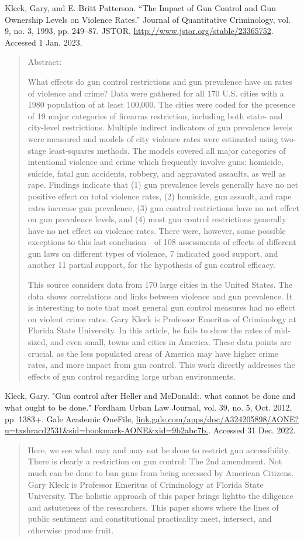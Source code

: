\documentclass [12pt]{article}
\newcommand{\bibent}{\noindent \hangindent 40pt}
\newcommand{\bibannote}{\begin{quotation}}
\newcommand{\bibendote}{\end{quotation}}
\begin{document}
\bibent Kleck, Gary, and E. Britt Patterson. “The Impact of Gun Control and Gun Ownership Levels on Violence Rates.” Journal of Quantitative Criminology, vol. 9, no. 3, 1993, pp. 249–87. JSTOR, \url{http://www.jstor.org/stable/23365752}. Accessed 1 Jan. 2023.
\bibannote
Abstract: \par What effects do gun control restrictions and gun prevalence have on rates of violence and crime? Data were gathered for all 170 U.S. cities with a 1980 population of at least 100,000. The cities were coded for the presence of 19 major categories of firearms restriction, including both state- and city-level restrictions. Multiple indirect indicators of gun prevalence levels were measured and models of city violence rates were estimated using two-stage least-squares methods. The models covered all major categories of intentional violence and crime which frequently involve guns: homicide, suicide, fatal gun accidents, robbery, and aggravated assaults, as well as rape. Findings indicate that (1) gun prevalence levels generally have no net positive effect on total violence rates, (2) homicide, gun assault, and rape rates increase gun prevalence, (3) gun control restrictions have no net effect on gun prevalence levels, and (4) most gun control restrictions generally have no net effect on violence rates. There were, however, some possible exceptions to this last conclusion—of 108 assessments of effects of different gun laws on different types of violence, 7 indicated good support, and another 11 partial support, for the hypothesis of gun control efficacy. \par
This source considers data from 170 large cities in the United States. The data shows correlations and links between violence and gun prevalence. It is interesting to note that most general gun control measures had no effect on violent crime rates. Gary Kleck is Professor Emeritus of Criminology at Florida State University. In this article, he fails to show the rates of mid-sized, and even small, towns and cities in America. These data points are crucial, as the less populated areas of America may have higher crime rates, and more impact from gun control. This work directly addresses the effects of gun control regarding large urban environments.
\bibendote


\bibent Kleck, Gary. "Gun control after Heller and McDonald:. what cannot be done and what ought to be done." Fordham Urban Law Journal, vol. 39, no. 5, Oct. 2012, pp. 1383+. Gale Academic OneFile, \url{link.gale.com/apps/doc/A324205898/AONE?u=txshracd2531&sid=bookmark-AONE&xid=9b2abc7b.}. Accessed 31 Dec. 2022.
\bibannote
Here, we see what may and may not be done to restrict gun accessibility. There is clearly a restriction on gun control: The 2nd amendment. Not much can be done to ban guns from being accessed by American Citizens. Gary Kleck is Professor Emeritus of Criminology at Florida State University. The holistic approach of this paper brings lightto the diligence and astuteness of the researchers. This paper shows where the lines of public sentiment and constitutional practicality meet, intersect, and otherwise produce fruit. 
\bibendote
\end{document}
